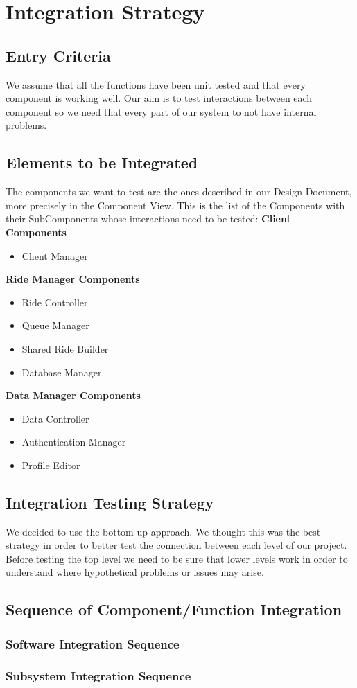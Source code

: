 \section{Integration Strategy}
\subsection{Entry Criteria}
We assume that all the functions have been unit tested and that every component is working well. Our aim is to test interactions between each component so we need that every part of our system to not have internal problems.
\subsection{Elements to be Integrated}
The components we want to test are the ones described in our Design Document, more precisely in the Component View.\newline
This is the list of the Components with their SubComponents whose interactions need to be tested: \newline
\newline
\textbf{Client Components}
\begin {itemize}
\item Client Manager
\end {itemize}
\textbf{Ride Manager Components}
\begin{itemize}
\item Ride Controller
\item Queue Manager
\item Shared Ride Builder
\item Database Manager
\end {itemize}
\textbf{Data Manager Components}
\begin {itemize}
\item Data Controller
\item Authentication Manager
\item Profile Editor
\end{itemize}
\subsection{Integration Testing Strategy}
We decided to use the bottom-up approach. We thought this was the best strategy in order to better test the connection between each level of our project. 
Before testing the top level we need to be sure that lower levels work in order to understand where hypothetical problems or issues may arise.
\subsection{Sequence of Component/Function Integration}
\subsubsection{Software Integration Sequence}
\subsubsection{Subsystem Integration Sequence}